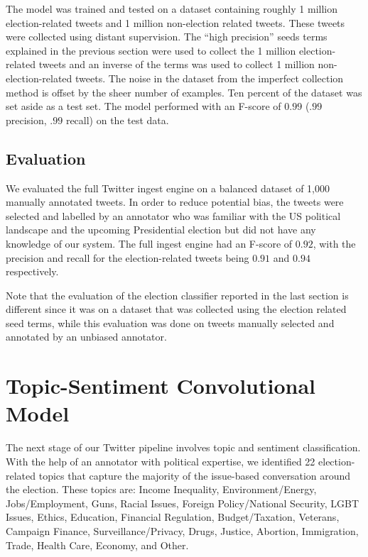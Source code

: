 \documentclass[letterpaper]{article}
\begin{document}
The model was trained and tested on a dataset containing roughly 1 million election-related tweets and 1 million non-election related tweets. These tweets were collected using distant supervision. The ``high precision'' seeds terms explained in the previous section were used to collect the 1 million election-related tweets and an inverse of the terms was used to collect 1 million non-election-related tweets. The noise in the dataset from the imperfect collection method is offset by the sheer number of examples. Ten percent of the dataset was set aside as a test set. The model performed with an F-score of $0.99$ ($.99$ precision, $.99$ recall) on the test data.%

\subsection{Evaluation} We evaluated the full Twitter ingest engine on a balanced dataset of 1,000 manually annotated tweets. In order to reduce potential bias, the tweets were selected and labelled by an annotator who was familiar with the US political landscape and the upcoming Presidential election but did not have any knowledge of our system. The full ingest engine had an F-score of $0.92$, with the precision and recall for the election-related tweets being $0.91$ and $0.94$ respectively.

Note that the evaluation of the election classifier reported in the last section is different since it was on a dataset that was collected using the election related seed terms, while this evaluation was done on tweets manually selected and annotated by an unbiased annotator. %









\section{Topic-Sentiment Convolutional Model}
The next stage of our Twitter pipeline involves topic and sentiment classification. With the help of an annotator with political expertise, we identified 22 election-related topics that capture the majority of the issue-based conversation around the election. These topics are: Income Inequality, Environment/Energy, Jobs/Employment, Guns, Racial Issues, Foreign Policy/National Security, LGBT Issues, Ethics, Education, Financial Regulation, Budget/Taxation, Veterans, Campaign Finance, Surveillance/Privacy, Drugs, Justice, Abortion, Immigration, Trade, Health Care, Economy, and Other.
\end{document}

